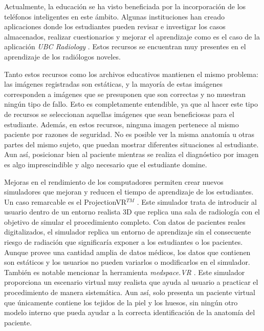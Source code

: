 Actualmente, la educación se ha visto beneficiada por la incorporación de los teléfonos inteligentes en este ámbito. Algunas instituciones han creado aplicaciones donde los estudiantes pueden revisar e investigar los casos almacenados, realizar cuestionarios y mejorar el aprendizaje como es el caso de la aplicación \emph{UBC Radiology} \cite{Spouge2017}. Estos recursos se encuentran muy presentes en el aprendizaje de los radiólogos noveles.

Tanto estos recursos como los archivos educativos mantienen el mismo problema: las imágenes registradas son estáticas, y la mayoría de estas imágenes corresponden a imágenes que se presuponen que son correctas y no muestran ningún tipo de fallo. Esto es completamente entendible, ya que al hacer este tipo de recursos se seleccionan aquellas imágenes que sean beneficiosas para el estudiante. Además, en estos recursos, ninguna imagen pertenece al mismo paciente por razones de seguridad. No es posible ver la misma anatomía u otras partes del mismo sujeto, que puedan mostrar diferentes situaciones al estudiante. Aun así, posicionar bien al paciente mientras se realiza el diagnóstico por imagen es algo imprescindible y algo necesario que el estudiante domine. 

 Mejoras en el rendimiento de los computadores permiten crear nuevos simuladores que mejoran y reducen el tiempo de aprendizaje de los estudiantes. Un caso remarcable es el  ProjectionVR$^{TM}$ \cite{shanahan2016student}. Este simulador trata de introducir al usuario dentro de un entorno realista 3D que replica una sala de radiología con el objetivo de simular el procedimiento completo. Con datos de pacientes reales digitalizados, el simulador replica un entorno de aprendizaje sin el consecuente riesgo de radiación que significaría exponer a los estudiantes o los pacientes. Aunque provee una cantidad amplia de datos médicos, los datos que contienen son estáticos y los usuarios no pueden variarlos o modificarlos en el simulador. También es notable mencionar la herramienta \emph{medspace.VR} \cite{medspace}. Este simulador proporciona un escenario virtual muy realista que ayuda al usuario a practicar el procedimiento de manera sistemática. Aun así, solo presenta un paciente virtual que únicamente contiene los tejidos de la piel y los huesos, sin ningún otro modelo interno que pueda ayudar a la correcta identificación de la anatomía del paciente.



